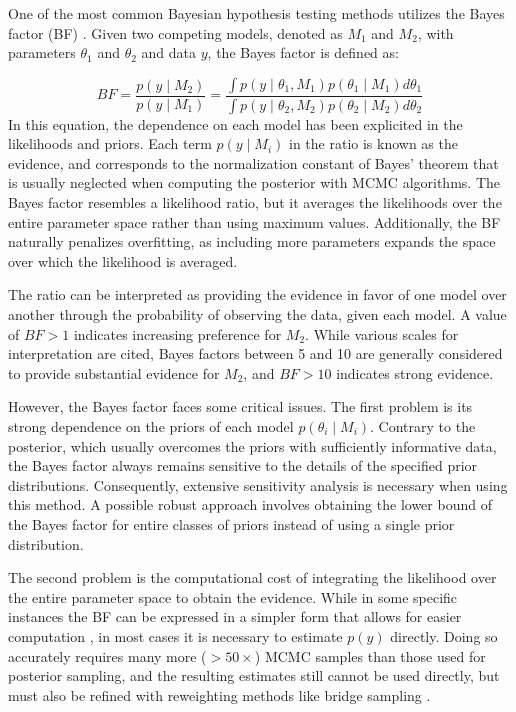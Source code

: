 One of the most common Bayesian hypothesis testing methods utilizes the Bayes factor (BF) \cite{kass1995bayes}. Given two competing models, denoted as $M_1$ and $M_2$, with parameters $\theta_1$ and $\theta_2$ and data $y$, the Bayes factor is defined as:

\begin{equation}
BF = \frac{p(y\mid M_2)}{p(y\mid M_1)} = \frac{\int p(y\mid \theta_1, M_1)p(\theta_1\mid M_1)d\theta_1}{\int p(y\mid \theta_2, M_2)p(\theta_2\mid M_2)d\theta_2}
\end{equation}
In this equation, the dependence on each model has been explicited in the likelihoods and priors. Each term $p(y\mid M_{i})$ in the ratio is known as the evidence, and corresponds to the normalization constant of Bayes' theorem that is usually neglected when computing the posterior with MCMC algorithms.
The Bayes factor resembles a likelihood ratio, but it averages the likelihoods over the entire parameter space rather
than using maximum values. Additionally, the BF naturally penalizes overfitting, as including more parameters expands the space over which the likelihood is averaged.

The ratio can be interpreted as providing the evidence in favor of one model over another through the probability of
observing the data, given each model. A value of $BF>1$ indicates increasing preference for $M_2$. While various scales for interpretation are cited, Bayes factors between 5 and 10 are generally considered to provide substantial evidence for $M_2$, and $BF>10$ indicates strong evidence.

However, the Bayes factor faces some critical issues. The first problem is its strong dependence on the priors of each
model $p(\theta_i\mid M_i)$. Contrary to the posterior, which usually overcomes the priors with sufficiently informative
data, the Bayes factor always remains sensitive to the details of the specified prior distributions. 
Consequently, extensive sensitivity analysis is necessary when using this method. A possible robust approach involves obtaining the lower bound of the Bayes factor for entire classes of priors instead of using a single prior distribution.

The second problem is the computational cost of integrating the likelihood over the entire parameter space to obtain the
evidence. While in some specific instances the BF can be expressed in a simpler form that allows for easier computation
\cite{heck2019caveat},
in most cases it is necessary to estimate $p(y)$ directly. Doing so accurately requires many
more ($>50\times$) MCMC samples than those used for posterior sampling, and the resulting estimates still cannot be used directly, but
must also be refined with reweighting methods like bridge sampling \cite{bridge}.

